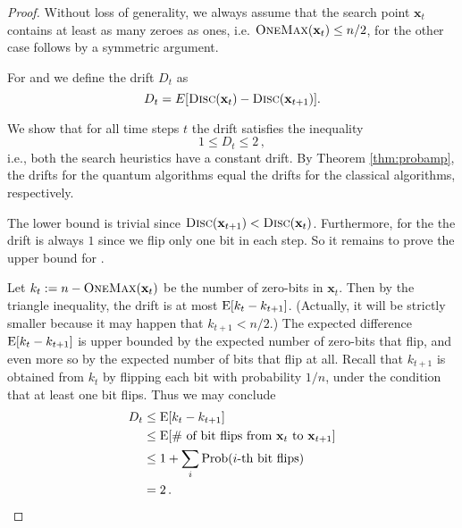 \begin{proof}
Without loss of generality, we always assume that the search point $\mathbf{x}_t$ contains at least as many zeroes as ones, i.e. $\textsc{OneMax}(\mathbf{x}_t) \le n/2$, for the other case follows by a symmetric argument. 
% 

For \rls and \ooea we define the drift $D_t$ as
\[ 
D_t =
E[\textsc{Disc}(\mathbf{x}_t)-\textsc{Disc}(\mathbf{x}_{t+1})].\]

We show that for all time steps $t$ the drift satisfies the inequality
\begin{equation}\label{eq:drift}
 1\le D_t\le 2\,,
\end{equation}
i.e., both the search heuristics have a constant
drift. By Theorem \ref{thm:probamp}, the drifts for the quantum
algorithms equal the drifts for the classical algorithms,
respectively.

The lower bound is trivial since
$\textsc{Disc}(\mathbf{x}_{t+1})<\textsc{Disc}(\mathbf{x}_{t})$. Furthermore,
for the \rls the drift is always $1$ since we flip only one bit in
each step.  So it remains to prove the upper bound for \ooea.

Let $k_t := n-\textsc{OneMax}(\mathbf{x}_t)$ be the number of zero-bits in $\mathbf{x}_t$. Then by the triangle inequality, the drift is at most $\operatorname{E}[k_{t}-k_{t+1}]$. (Actually, it will be strictly smaller because it may happen that $k_{t+1} < n/2$.) The expected difference $\operatorname{E}[k_{t}-k_{t+1}]$ is upper bounded by the expected number of zero-bits that flip, and even more so by the expected number of bits that flip at all. Recall that $k_{t+1}$ is obtained from $k_t$ by flipping each bit with probability $1/n$, under the condition that at least one bit flips. Thus we may conclude
\begin{align*}
D_t & \le  \operatorname{E}[k_{t}-k_{t+1}] \\
& \le  \operatorname{E}[\#\text{ of bit flips from } \mathbf{x}_t\text{ to }\mathbf{x}_{t+1}] \\
& \le  1+\sum_{i}\mathrm{Prob}(i\text{-th bit flips})\\
& = 2\,.\\
\end{align*}


\end{proof}
